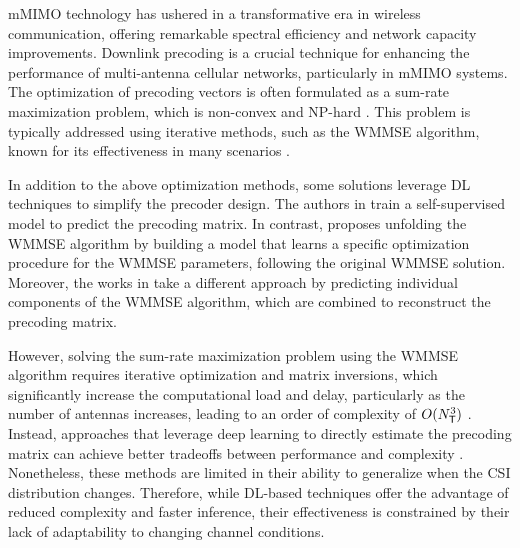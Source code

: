 \Gls{mMIMO} technology has ushered in a transformative era in wireless communication, offering remarkable spectral efficiency and network capacity improvements.
Downlink precoding is a crucial technique for enhancing the performance of multi-antenna cellular networks, particularly in \gls{mMIMO} systems. The optimization of precoding vectors is often formulated as a sum-rate maximization problem, which is non-convex and NP-hard \cite{luo2008dynamic}. This problem is typically addressed using iterative methods, such as the \gls{WMMSE} algorithm, known for its effectiveness in many scenarios \cite{shi2011iteratively}. 

In addition to the above optimization methods, some solutions leverage \gls{DL} techniques to simplify the precoder design. The authors in \cite{hojatian2021unsupervised} train a self-supervised model to predict the precoding matrix. In contrast, \cite{9403959} proposes unfolding the WMMSE algorithm by building a model that learns a specific optimization procedure for the WMMSE parameters, following the original WMMSE solution. Moreover, the works in \cite{yang2022learning, 8935405, lyu2023downlink} take a different approach by predicting individual components of the \gls{WMMSE} algorithm, which are combined to reconstruct the precoding matrix.

However, solving the sum-rate maximization problem using the \gls{WMMSE} algorithm requires iterative optimization and matrix inversions, which significantly increase the computational load and delay, particularly as the number of antennas increases, leading to an order of complexity of $O(N^3_{\sf{T}})$ \cite{shi2011iteratively}. Instead, approaches that leverage deep learning to directly estimate the precoding matrix can achieve better tradeoffs between performance and complexity \cite{hojatian2021unsupervised}. Nonetheless, these methods are limited in their ability to generalize when the \gls{CSI} distribution changes. Therefore, while \gls{DL}-based techniques offer the advantage of reduced complexity and faster inference, their effectiveness is constrained by their lack of adaptability to changing channel conditions. 

